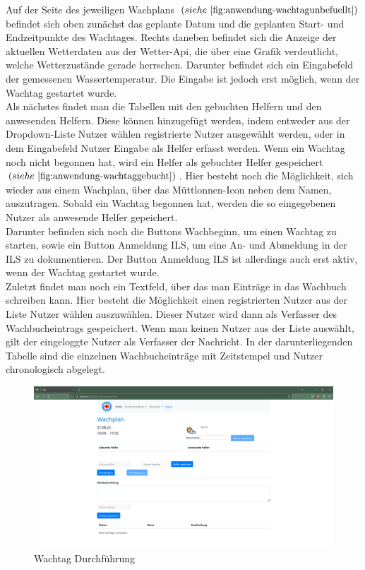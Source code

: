 \documentclass[fontsize=12pt,openright,oneside,paper=a4,BCOR=1cm]{scrbook}
\begin{document}
Auf der Seite des jeweiligen Wachplans $(siehe~\ref{fig:anwendung-wachtagunbefuellt})$ befindet sich oben zun\"achst das geplante Datum und die geplanten Start- und Endzeitpunkte des Wachtages. Rechts daneben befindet sich die Anzeige der aktuellen Wetterdaten aus der Wetter-Api, die \"uber eine Grafik verdeutlicht, welche Wetterzust\"ande gerade herrschen. Darunter befindet sich ein Eingabefeld der gemessenen Wassertemperatur. Die Eingabe ist jedoch erst m\"oglich, wenn der Wachtag gestartet wurde. \\
Als n\"achstes findet man die Tabellen mit den gebuchten Helfern und den anwesenden Helfern. Diese k\"onnen hinzugef\"ugt werden, indem entweder aus der Dropdown-Liste \glqq Nutzer w\"ahlen\grqq{} registrierte Nutzer ausgew\"ahlt werden, oder in dem Eingabefeld \glqq Nutzer Eingabe\grqq{} als Helfer erfasst werden. Wenn ein Wachtag noch nicht begonnen hat, wird ein Helfer als gebuchter Helfer gespeichert $(siehe~\ref{fig:anwendung-wachtaggebucht})$. Hier besteht noch die M\"oglichkeit, sich wieder aus einem Wachplan, \"uber das M\"uttlonnen-Icon neben dem Namen, auszutragen. Sobald ein Wachtag begonnen hat, werden die so eingegebenen Nutzer als anwesende Helfer gepeichert. \\
Darunter befinden sich noch die Buttons \glqq Wachbeginn\grqq{}, um einen Wachtag zu starten, sowie ein Button \glqq Anmeldung ILS\grqq{}, um eine An- und Abmeldung in der ILS zu dokumentieren. Der Button \glqq Anmeldung ILS\grqq{} ist allerdings auch erst aktiv, wenn der Wachtag gestartet wurde. \\
Zuletzt findet man noch ein Textfeld, \"uber das man Eintr\"age in das Wachbuch schreiben kann. Hier besteht die M\"oglichkeit einen registrierten Nutzer aus der Liste \glqq Nutzer w\"ahlen\grqq{} auszuw\"ahlen. Dieser Nutzer wird dann als Verfasser des Wachbucheintrags gespeichert. Wenn man keinen Nutzer aus der Liste ausw\"ahlt, gilt der eingeloggte Nutzer als Verfasser der Nachricht. In der darunterliegenden Tabelle sind die einzelnen Wachbucheintr\"age mit Zeitstempel und Nutzer chronologisch abgelegt.

\begin{figure}[H]
  \centering
    \includegraphics[width=0.7\linewidth]{Anlagen/Anwendung/8WachtagUnbefuellt.png}
    \caption{Wachtag Durchf\"uhrung}
  \label{fig:anwendung-wachtagunbefuellt}
\end{figure}
\end{document}
